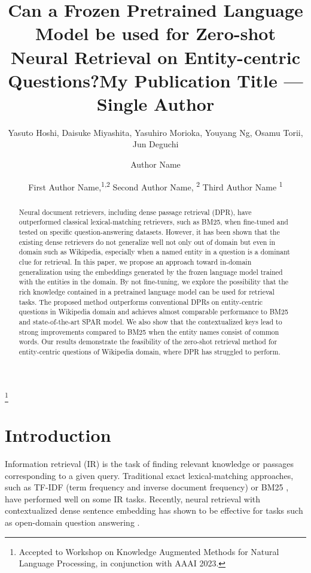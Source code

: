 \documentclass[letterpaper]{article} \usepackage{aaai23}  \usepackage{times}  \usepackage{helvet}  \usepackage{courier}  \usepackage[hyphens]{url}  \usepackage{graphicx} \urlstyle{rm} \def\UrlFont{\rm}  \usepackage{natbib}  \usepackage{caption} \frenchspacing  \setlength{\pdfpagewidth}{8.5in}  \setlength{\pdfpageheight}{11in}  \usepackage{algorithm}
\title{Can a Frozen Pretrained Language Model be used for Zero-shot Neural Retrieval on Entity-centric Questions?}
\author{
Yasuto Hoshi,
    Daisuke Miyashita,
    Yasuhiro Morioka,
    Youyang Ng,
    Osamu Torii,
    Jun Deguchi
    }
\title{My Publication Title --- Single Author}
\author {
    Author Name
}
\author {
First Author Name,\textsuperscript{\rm 1,\rm 2}
    Second Author Name, \textsuperscript{\rm 2}
    Third Author Name \textsuperscript{\rm 1}
}
\newcommand\workshopnote[1]{\renewcommand\thefootnote{}\footnote{#1}}
\begin{document}
\maketitle

\begin{abstract}
	Neural document retrievers, including dense passage retrieval (DPR), have outperformed classical lexical-matching retrievers, such as BM25, when fine-tuned and tested on specific question-answering datasets.
	However, it has been shown that the existing dense retrievers do not generalize well not only out of domain but even in domain such as Wikipedia, especially when a named entity in a question is a dominant clue for retrieval.
	In this paper, we propose an approach toward in-domain generalization using the embeddings generated by the frozen language model trained with the entities in the domain.
	By not fine-tuning, we explore the possibility that the rich knowledge contained in a pretrained language model can be used for retrieval tasks.
	The proposed method outperforms conventional DPRs on entity-centric questions in Wikipedia domain and achieves almost comparable performance to BM25 and state-of-the-art SPAR model.
	We also show that the contextualized keys lead to strong improvements compared to BM25 when the entity names consist of common words.
	Our results demonstrate the feasibility of the zero-shot retrieval method for entity-centric questions of Wikipedia domain, where DPR has struggled to perform.
\end{abstract}

\workshopnote{Accepted to Workshop on Knowledge Augmented Methods for Natural Language Processing, in conjunction with AAAI 2023.}

\renewcommand{\thefootnote}{\arabic{footnote}}



\section{Introduction}
Information retrieval (IR) is the task of finding relevant knowledge or passages corresponding to a given query.
Traditional exact lexical-matching approaches, such as TF-IDF (term frequency and inverse document frequency) or BM25 \citep{robertson1995okapi, robertson2009probabilistic}, have performed well on some IR tasks.
Recently, neural retrieval with contextualized dense sentence embedding has shown to be effective for tasks such as open-domain question answering \citep[e.g.,][]{karpukhin-etal-2020-dense,xiong2021approximate}.
\end{document}
